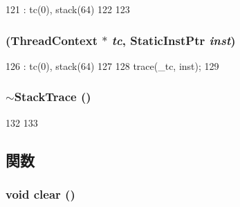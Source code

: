 \begin{DoxyCode}
121     : tc(0), stack(64)
122 {
123 }
\end{DoxyCode}
\hypertarget{classAlphaISA_1_1StackTrace_a7c751415d8c87372fc7d24513309cf1b}{
\subsubsection[{StackTrace}]{ ({\bf ThreadContext} $\ast$ {\em tc}, \/  {\bf StaticInstPtr} {\em inst})}}
\label{classAlphaISA_1_1StackTrace_a7c751415d8c87372fc7d24513309cf1b}



\begin{DoxyCode}
126     : tc(0), stack(64)
127 {
128     trace(_tc, inst);
129 }
\end{DoxyCode}
\hypertarget{classAlphaISA_1_1StackTrace_adec953886bb73db4f2ec91ed12810135}{
\subsubsection[{$\sim$StackTrace}]{\setlength{\rightskip}{0pt plus 5cm}$\sim${\bf StackTrace} ()}}
\label{classAlphaISA_1_1StackTrace_adec953886bb73db4f2ec91ed12810135}



\begin{DoxyCode}
132 {
133 }
\end{DoxyCode}


\subsection{関数}
\hypertarget{classAlphaISA_1_1StackTrace_ac8bb3912a3ce86b15842e79d0b421204}{
\subsubsection[{clear}]{\setlength{\rightskip}{0pt plus 5cm}void clear ()}}
\label{classAlphaISA_1_1StackTrace_ac8bb3912a3ce86b15842e79d0b421204}




